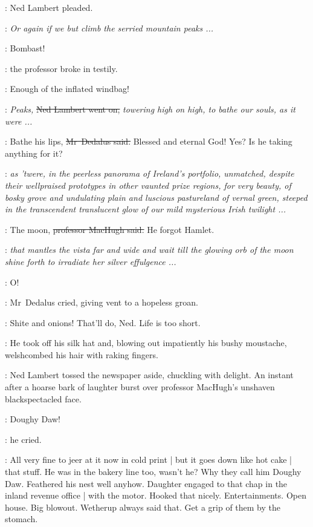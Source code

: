 :
Ned Lambert pleaded.

\lambert:
\stage{[as Dawson]}
\emph{Or again if we but climb the serried mountain peaks ...}

\machugh:
Bombast!

:
the professor broke in testily.

\machugh:
Enough of the inflated windbag!

\lambert:
\stage{[as Dawson]}
\emph{Peaks,}
\sout{Ned Lambert went on,}
\emph{towering high on high,
to bathe our souls,
as it were ...}

\simon:
Bathe his lips,
\sout{Mr~Dedalus said.}
Blessed and eternal God!
Yes?
Is he taking anything for it?

\lambert:
\stage{[as Dawson]}
\emph{as 'twere,
in the peerless panorama of Ireland's portfolio,
unmatched,
despite their wellpraised prototypes in other vaunted prize regions,
for very beauty,
of bosky grove and undulating plain and luscious pastureland of vernal green,
steeped in the transcendent translucent glow
of our mild mysterious Irish twilight ...}



\machugh:
The moon,
\sout{professor MacHugh said.}
He forgot Hamlet.

\lambert:
\stage{[as Dawson]}
\emph{that mantles the vista far and wide
and wait till the glowing orb of the moon shine forth
to irradiate her silver effulgence ...}

\simon:
O!

:
Mr~Dedalus cried,
giving vent to a hopeless groan.

\simon:
Shite and onions!
That'll do, Ned.
Life is too short.

:
He took off his silk hat
and, blowing out impatiently his bushy moustache,
welshcombed his hair with raking fingers.

:
Ned Lambert tossed the newspaper aside,
chuckling with delight.
An instant after a hoarse bark of laughter
burst over professor MacHugh's unshaven blackspectacled face.

\machugh:
Doughy Daw!

:
he cried.



\BloomInt:
All very fine to jeer at it now in cold print |
but it goes down like hot cake |
that stuff.
He was in the bakery line too, wasn't he?
Why they call him Doughy Daw.
Feathered his nest well anyhow.
Daughter engaged to that chap in the inland revenue office |
with the motor.
Hooked that nicely.
Entertainments.
Open house.
Big blowout.
Wetherup always said that.
Get a grip of them by the stomach.

